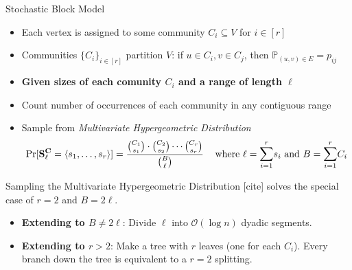 







\begin{block}{Stochastic Block Model}%

\begin{itemize}
    \item Each vertex is assigned to some community $C_i\subseteq V$ for $i\in [r]$
    \item Communities $\{C_i\}_{i\in [r]}$ partition $V$:
          if $u\in C_i, v\in C_j$, then $\mathbb P_{(u, v)\in E} = p_{ij}$
\end{itemize}
\begin{itemize}
\item [] \textbf{Given sizes of each comunity $C_i$ and a range of length $\ell$}
    \item Count number of occurrences of each community in any contiguous range%
    \item Sample from \emph{Multivariate Hypergeometric Distribution}%
\[
\Pr[\mathbf{S}^\mathbf{C}_\ell = \langle s_1, \ldots, s_r \rangle]
= \frac{\binom{C_1}{s_1}\cdot\binom{C_2}{s_2}\cdots\binom{C_r}{s_r}}{\binom{B}{\ell}}
\hspace{2ex}\textrm{ where } \ell = \mathlarger{\sum}^{r}_{i=1} s_i
\textrm{ and } B = \mathlarger{\sum}^{r}_{i=1} C_i
\]
\end{itemize}


\begin{alertblock}{Sampling the Multivariate Hypergeometric Distribution}
[cite] solves the special case of $r=2$ and $B = 2\ell$.
\begin{itemize}
    \item \textbf{Extending to $B\not= 2\ell$}: Divide $\ell$ into $\mathcal O(\log n)$ dyadic segments.
    \item \textbf{Extending to $r>2$}: Make a tree with $r$ leaves (one for each $C_i$).
          Every branch down the tree is equivalent to a $r=2$ splitting.
\end{itemize}
\end{alertblock}

\end{block}

